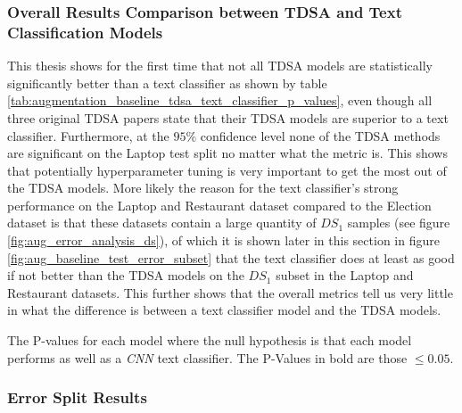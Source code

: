 \FloatBarrier
\subsubsection{Overall Results Comparison between TDSA and Text Classification Models}
This thesis shows for the first time that not all TDSA models are statistically significantly better than a text classifier as shown by table \ref{tab:augmentation_baseline_tdsa_text_classifier_p_values}, even though all three original TDSA papers state that their TDSA models are superior to a text classifier. Furthermore, at the $95\%$ confidence level none of the TDSA methods are significant on the Laptop test split no matter what the metric is. This shows that potentially hyperparameter tuning is very important to get the most out of the TDSA models. More likely the reason for the text classifier's strong performance on the Laptop and Restaurant dataset compared to the Election dataset is that these datasets contain a large quantity of $DS_1$ samples (see figure \ref{fig:aug_error_analysis_ds}), of which it is shown later in this section in figure \ref{fig:aug_baseline_test_error_subset} that the text classifier does at least as good if not better than the TDSA models on the $DS_1$ subset in the Laptop and Restaurant datasets. This further shows that the overall metrics tell us very little in what the difference is between a text classifier model and the TDSA models.  



\begin{table}[ht!]
    \centering
    
    \caption{The P-values for each model where the null hypothesis is that each model performs as well as a \textit{CNN} text classifier. The P-Values in bold are those $\leq 0.05$.}
    \label{tab:augmentation_baseline_tdsa_text_classifier_p_values}
\end{table}

\FloatBarrier
\subsubsection{Error Split Results}
\label{section:augmentation_cwr_error_split_results_sub}

